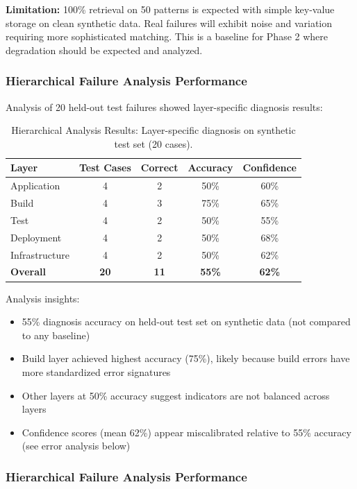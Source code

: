 \documentclass[11pt]{article}
\begin{document}
\textbf{Limitation:} 100\% retrieval on 50 patterns is expected with simple key-value storage on clean synthetic data. Real failures will exhibit noise and variation requiring more sophisticated matching. This is a baseline for Phase 2 where degradation should be expected and analyzed.

\subsubsection{Hierarchical Failure Analysis Performance}

Analysis of 20 held-out test failures showed layer-specific diagnosis results:

\begin{table}[h!]
\centering
\begin{tabular}{lcccc}
\toprule
\textbf{Layer} & \textbf{Test Cases} & \textbf{Correct} & \textbf{Accuracy} & \textbf{Confidence} \\
\midrule
Application & 4 & 2 & 50\% & 60\% \\
Build & 4 & 3 & 75\% & 65\% \\
Test & 4 & 2 & 50\% & 55\% \\
Deployment & 4 & 2 & 50\% & 68\% \\
Infrastructure & 4 & 2 & 50\% & 62\% \\
\midrule
\textbf{Overall} & \textbf{20} & \textbf{11} & \textbf{55\%} & \textbf{62\%} \\
\bottomrule
\end{tabular}
\caption{Hierarchical Analysis Results: Layer-specific diagnosis on synthetic test set (20 cases).}
\label{tab:analysis_results}
\end{table}

Analysis insights:
\begin{itemize}
    \item 55\% diagnosis accuracy on held-out test set on synthetic data (not compared to any baseline)
    \item Build layer achieved highest accuracy (75\%), likely because build errors have more standardized error signatures
    \item Other layers at 50\% accuracy suggest indicators are not balanced across layers
    \item Confidence scores (mean 62\%) appear miscalibrated relative to 55\% accuracy (see error analysis below)
\end{itemize}

\subsubsection{Hierarchical Failure Analysis Performance}
\end{document}
